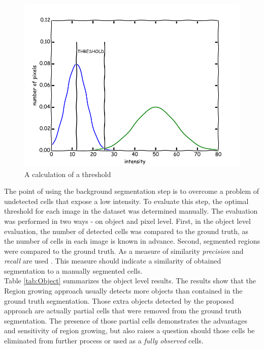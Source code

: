 \begin{figure}
	\begin{center}
		\includegraphics[scale=0.4]{Figures/segmentation/approx_hist_thr}
	\end{center}
	\label{img:Thr}
	\caption{A calculation of a threshold}
\end{figure}

The point of using the background segmentation step is to overcome a problem of undetected cells that expose a low intensity. To evaluate this step, the optimal threshold for each image in the dataset was determined manually. The evaluation was performed in two ways - on object and pixel level. First, in the object level evaluation, the number of detected cells was compared to the ground truth, as the number of cells in each image is known in advance. Second, segmented regions were compared to the ground truth. As a measure of similarity \textit{precision} and \textit{recall} are used . This measure should indicate a similarity of obtained segmentation to a manually segmented cells. \\

Table \ref{tab:Object} summarizes the object level results. The results show that the Region growing approach usually detects more objects than contained in the ground truth segmentation. Those extra objects detected by the proposed approach are actually partial cells that were removed from the ground truth segmentation. The presence of those partial cells demonstrates the advantages and sensitivity of region growing, but also raises a question should those cells be eliminated from further process or used as a \textit{fully observed} cells.

